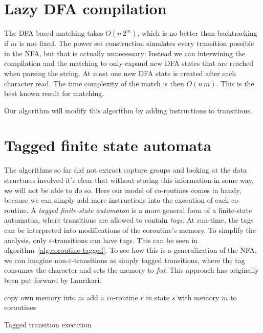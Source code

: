 \documentclass[11pt]{Thesis}
\theoremstyle{definition}
\begin{document}
\section{Lazy DFA compilation}
The DFA based matching takes $O(n\, 2^m)$, which is no better than backtracking
if $m$ is not fixed. The power set construction simulates every transition 
possible in the NFA, but that is actually unnecessary: Instead we can 
interwining the compilation and the matching to only expand new DFA states that
are reached when parsing the string. At most one new DFA state is created after
each character read. The time complexity of the match is then $O(n\, m)$. 
This is the best known result for matching\cite{Cox07a,Cox09a,Cox10a}.

Our algorithm will modify this algorithm by adding instructions to transitions.

\section{Tagged finite state automata}
The algorithms so far did not extract capture groups and looking at the data 
structures involved it's clear that without storing this information in some 
way, we will not be able to do so. Here our model of co-routines comes in 
handy, because we can simply add more instructions into the execution of each 
co-routine. A \emph{tagged finite-state automaton} is a 
more general form of a finite-state automaton, where transitions are allowed 
to contain \emph{tags}. At run-time, the tags can be interpreted into 
modifications of the coroutine's memory. To simplify the analysis, only 
$\varepsilon$-transitions can have tags. This can be seen in
algorithm~\ref{alg:coroutine-tagged}. To see how this is a generalization of 
the NFA, we can imagine non-$\varepsilon$-transitions as simply tagged 
transitions, where the tag consumes the character and sets the memory to \emph{fed}.
This approach has originally been put forward by Laurikari\cite{Laur00a}.

\begin{algorithm*}
  \begin{algorithmic}
        \State copy own memory into $m$
        \State {}
        \State add a co-routine $r$ in state $s$ with memory $m$ to coroutines
        \State {}
      \EndIf
    \EndFor
  \EndFunction
  \end{algorithmic}
  \caption{\label{alg:coroutine-tagged}Tagged transition execution}
\end{algorithm*}
\end{document}

